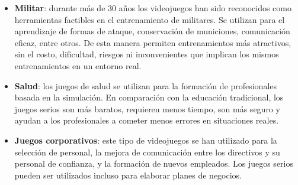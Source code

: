 \begin{itemize}

\item \textbf{Militar}: durante más de $30$ años los videojuegos han sido
    reconocidos como herramientas factibles en el entrenamiento de militares. Se utilizan para el aprendizaje de formas de ataque, conservación
    de municiones, comunicación eficaz,
    entre otros.  De esta manera permiten entrenamientos más
    atractivos, sin el costo, dificultad, riesgos ni inconvenientes que implican
    los mismos entrenamientos en un entorno real\cite{education:games}.

\item \textbf{Salud}: los juegos de salud se utilizan para la formación de
    profesionales basada en la simulación. En comparación con la educación
    tradicional, los juegos serios son más baratos, requieren menos tiempo, son
    más seguro y ayudan a los profesionales a cometer menos errores en
    situaciones reales\cite{education:games}. 

\item \textbf{Juegos corporativos}: este tipo de videojuegos se han utilizado
    para la selección de personal, la mejora de comunicación entre los
    directivos y su personal de confianza, y la formación de nuevos empleados.
    Los juegos serios pueden ser utilizados incluso para elaborar planes de
    negocios\cite{education:games}. 

\end{itemize}

